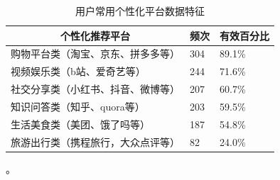 \begin{table}[H]
\centering
\caption{用户常用个性化平台数据特征}
\label{tab:gxhpt}
\begin{tabular}{@{}lll@{}}
\toprule
\multicolumn{1}{c}{\textbf{个性化推荐平台}} & \multicolumn{1}{c}{\textbf{频次}} & \multicolumn{1}{c}{\textbf{有效百分比}} \\ \midrule
购物平台类（淘宝、京东、拼多多等）                    & 304                             & 89.1\%                             \\
视频娱乐类（b站、爱奇艺等）                      & 244                             & 71.6\%                             \\
社交分享类（小红书、抖音、微博等）                    & 207                             & 60.7\%                             \\
知识问答类（知乎、quora等）                     & 203                             & 59.5\%                             \\
生活美食类（美团、饿了吗等）                       & 187                             & 54.8\%                             \\
旅游出行类（携程旅行，大众点评等）                    & 82                              & 24.0\%                             \\ \bottomrule
\end{tabular}
\end{table}
。
